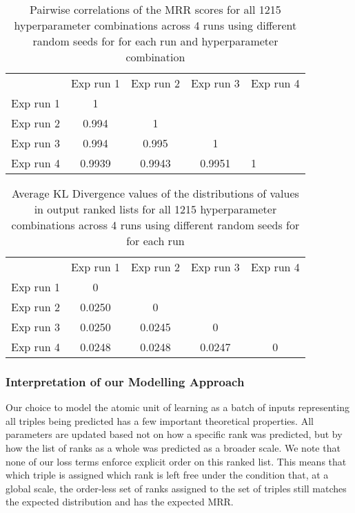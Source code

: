 \begin{table}
    \centering
    \begin{tabular}{ccccl}
         &  Exp run 1&  Exp run 2& Exp run 3&Exp run 4\\
         Exp run 1&  1&  &  &\\
         Exp run 2&  0.994&  1&  &\\
         Exp run 3&  0.994&  0.995&  1&\\
         Exp run 4& 0.9939& 0.9943& 0.9951&1\\
    \end{tabular}
    \caption{Pairwise correlations of the MRR scores for all 1215 hyperparameter combinations across 4 runs using different random seeds for for each run and hyperparameter combination}
    \label{tab:mrr-corr}
\end{table}

\begin{table}
    \centering
    \begin{tabular}{ccccc}
         &  Exp run 1&  Exp run 2&  Exp run 3& Exp run 4
\\
         Exp run 1&  0&  &  & 
\\
         Exp run 2&  0.0250&  0&  & 
\\
         Exp run 3&  0.0250&  0.0245&  0& 
\\
         Exp run 4&  0.0248&  0.0248&  0.0247& 0\\
    \end{tabular}
    \caption{Average KL Divergence values of the distributions of values in output ranked lists  for all 1215 hyperparameter combinations across 4 runs using different random seeds for for each run}
    \label{tab:kl-div}
\end{table}

\subsubsection{Interpretation of our Modelling Approach}
Our choice to model the atomic unit of learning as a batch of inputs representing all triples being predicted has a few important theoretical properties. All parameters are updated based not on how a specific rank was predicted, but by how the list of ranks as a whole was predicted as a broader scale. We note that none of our loss terms enforce explicit order on this ranked list. This means that which triple is assigned which rank is left free under the condition that, at a global scale, the order-less set of ranks assigned to the set of triples still matches the expected distribution and has the expected MRR.

